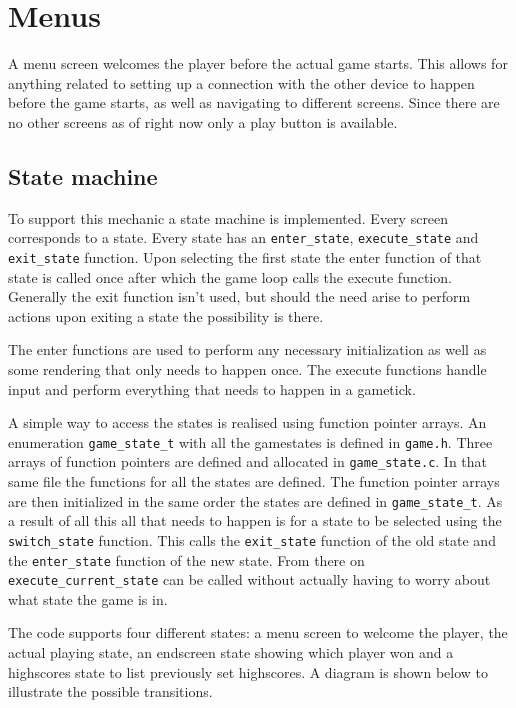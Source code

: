 \section{Menus}
\label{sec:menus}

A menu screen welcomes the player before the actual game starts. This allows
for anything related to setting up a connection with the other device to
happen before the game starts, as well as navigating to different screens.
Since there are no other screens as of right now only a play button is
available.

\subsection{State machine}
\label{sec:state-machine}
To support this mechanic a state machine is implemented. Every screen
corresponds to a state. Every state has an \texttt{enter\_state},
\texttt{execute\_state} and \texttt{exit\_state} function. Upon selecting the
first state the enter function of that state is called once after which the
game loop calls the execute function. Generally the exit function isn't used,
but should the need arise to perform actions upon exiting a state the
possibility is there.

The enter functions are used to perform any necessary initialization as well
as some rendering that only needs to happen once. The execute functions handle
input and perform everything that needs to happen in a gametick.

A simple way to access the states is realised using function pointer arrays.
An enumeration \texttt{game\_state\_t} with all the gamestates is defined in
\texttt{game.h}. Three arrays of function pointers are defined and allocated
in \texttt{game\_state.c}. In that same file the functions for all the states
are defined. The function pointer arrays are then initialized in the same
order the states are defined in \texttt{game\_state\_t}. As a result of all
this all that needs to happen is for a state to be selected using the
\texttt{switch\_state} function. This calls the \texttt{exit\_state} function
of the old state and the \texttt{enter\_state} function of the new state. From
there on \texttt{execute\_current\_state} can be called without actually
having to worry about what state the game is in.

The code supports four different states: a menu screen to welcome the player,
the actual playing state, an endscreen state showing which player won and a
highscores state to list previously set highscores. A diagram is shown below
to illustrate the possible transitions.

